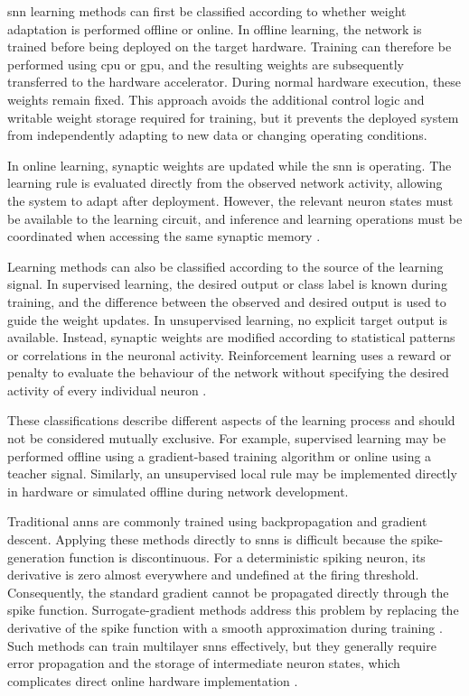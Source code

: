 \gls{snn} learning methods can first be classified according to whether weight adaptation is performed offline or online. In offline learning, the network is trained before being deployed on the target hardware. Training can therefore be performed using \gls{cpu} or \gls{gpu}, and the resulting weights are subsequently transferred to the hardware accelerator. During normal hardware execution, these weights remain fixed. This approach avoids the additional control logic and writable weight storage required for training, but it prevents the deployed system from independently adapting to new data or changing operating conditions.

In online learning, synaptic weights are updated while the \gls{snn} is operating. The learning rule is evaluated directly from the observed network activity, allowing the system to adapt after deployment. However, the relevant neuron states must be available to the learning circuit, and inference and learning operations must be coordinated when accessing the same synaptic memory \cite{Frenkel2019ODIN}.

Learning methods can also be classified according to the source of the learning signal. In supervised learning, the desired output or class label is known during training, and the difference between the observed and desired output is used to guide the weight updates. In unsupervised learning, no explicit target output is available. Instead, synaptic weights are modified according to statistical patterns or correlations in the neuronal activity. Reinforcement learning uses a reward or penalty to evaluate the behaviour of the network without specifying the desired activity of every individual neuron \cite{Neftci2019}.

These classifications describe different aspects of the learning process and should not be considered mutually exclusive. For example, supervised learning may be performed offline using a gradient-based training algorithm or online using a teacher signal. Similarly, an unsupervised local rule may be implemented directly in hardware or simulated offline during network development.

Traditional \gls{ann}s are commonly trained using backpropagation and gradient descent. Applying these methods directly to \gls{snn}s is difficult because the spike-generation function is discontinuous. For a deterministic spiking neuron, its derivative is zero almost everywhere and undefined at the firing threshold. Consequently, the standard gradient cannot be propagated directly through the spike function. Surrogate-gradient methods address this problem by replacing the derivative of the spike function with a smooth approximation during training \cite{Neftci2019}. Such methods can train multilayer \gls{snn}s effectively, but they generally require error propagation and the storage of intermediate neuron states, which complicates direct online hardware implementation \cite{Zenke2018}.

